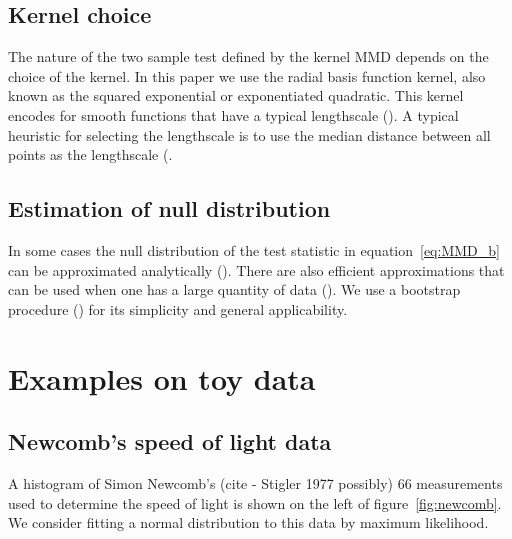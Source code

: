 \documentclass{article} %
\begin{document}
\subsection{Kernel choice}

The nature of the two sample test defined by the kernel MMD depends on the choice of the kernel.
In this paper we use the radial basis function kernel, also known as the squared exponential or exponentiated quadratic.
This kernel encodes for smooth functions that have a typical lengthscale ().
A typical heuristic for selecting the lengthscale is to use the median distance between all points as the lengthscale (.

\subsection{Estimation of null distribution}

In some cases the null distribution of the test statistic in equation~\ref{eq:MMD_b} can be approximated analytically ().
There are also efficient approximations that can be used when one has a large quantity of data ().
We use a bootstrap procedure () for its simplicity and general applicability.

\section{Examples on toy data}

\subsection{Newcomb's speed of light data}


A histogram of Simon Newcomb's (cite - Stigler 1977 possibly) 66 measurements used to determine the speed of light is shown on the left of figure~\ref{fig:newcomb}.
We consider fitting a normal distribution to this data by maximum likelihood\footnotemark.
\end{document}
